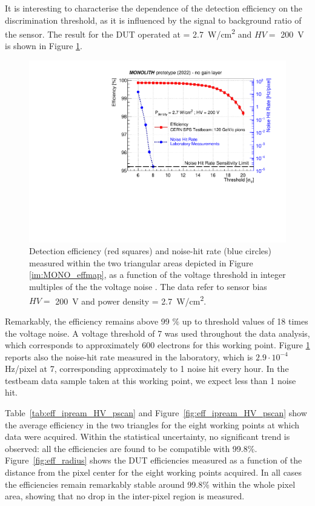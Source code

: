 		It is interesting to characterise the dependence of the detection efficiency on the discrimination threshold, as it is influenced by the signal to background ratio of the sensor. The result for the DUT operated at \power = \SI{2.7}{\watt/\centi\meter^2} and $HV=$ \SI{200}{\volt} is shown in Figure \ref{im:MONO_effthrscan}.
		\begin{figure}[h]
			\centering 
			\includegraphics[width=0.67\linewidth]{files/MONOLITH_paper/eff_fhr_vs_thr.pdf}
			\caption{Detection efficiency (red squares) and noise-hit rate (blue circles) measured within the two triangular areas depicted in Figure \ref{im:MONO_effmap}, as a function of the voltage threshold in integer multiples of the the voltage noise \noise. The data refer to sensor bias $ HV =$ \SI{200}{\volt} and power density \power = \SI{2.7}{\watt/\centi\meter^2}.}
			\label{im:MONO_effthrscan} 
		\end{figure}
	
		 Remarkably, the efficiency remains above 99 $\%$ up to threshold values of 18 times the voltage noise. 
		A voltage threshold of 7 \noise was used throughout the data analysis, which corresponds to approximately 600 electrons for this working point. Figure \ref{im:MONO_effthrscan} reports also the noise-hit rate measured in the laboratory, which is $2.9\cdot 10^{-4}$ Hz/pixel at 7\noise, corresponding approximately to 1 noise hit every hour. In the testbeam data sample taken at this working point, we expect less than 1 noise hit.
		

		Table~\ref{tab:eff_ipream_HV_pscan} and Figure~\ref{fig:eff_ipream_HV_pscan} show the average efficiency in the two triangles for the eight working points at which data were acquired. 
		Within the statistical uncertainty, no significant trend is observed: all the efficiencies are found to be compatible with 99.8\%. Figure~\ref{fig:eff_radius} shows  the DUT efficiencies measured as a function of the distance from the pixel center for the eight working points acquired. In all cases the efficiencies remain remarkably stable around 99.8\% within the whole pixel area, showing that no drop in the inter-pixel region is measured.

